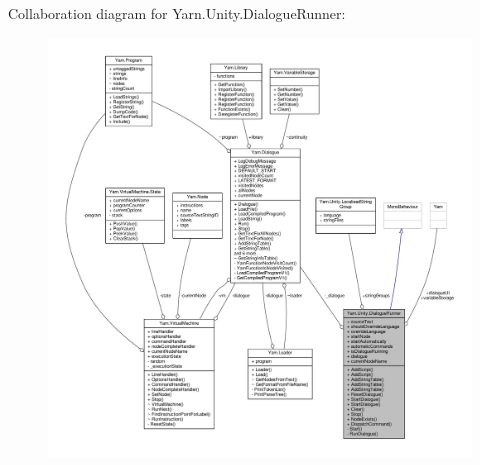 Collaboration diagram for Yarn.\-Unity.\-Dialogue\-Runner\-:
\nopagebreak
\begin{figure}[H]
\begin{center}
\leavevmode
\includegraphics[width=350pt]{d0/db6/a00692}
\end{center}
\end{figure}
